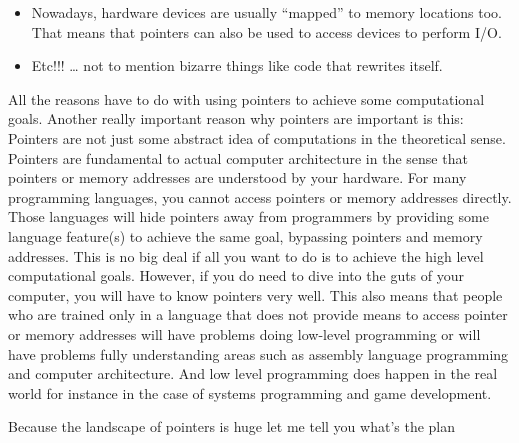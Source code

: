 \documentclass[
]{article}
\begin{document}
\begin{itemize}
\item
  Nowadays, hardware devices are usually ``mapped'' to memory locations
  too. That means that pointers can also be used to access devices to
  perform I/O.
\item
  Etc!!! \ldots{} not to mention bizarre things like code that rewrites
  itself.
\end{itemize}

All the reasons have to do with using pointers to achieve some
computational goals. Another really important reason why pointers are
important is this: Pointers are not just some abstract idea of
computations in the theoretical sense. Pointers are fundamental to
actual computer architecture in the sense that pointers or memory
addresses are understood by your hardware. For many programming
languages, you cannot access pointers or memory addresses directly.
Those languages will hide pointers away from programmers by providing
some language feature(s) to achieve the same goal, bypassing pointers
and memory addresses. This is no big deal if all you want to do is to
achieve the high level computational goals. However, if you do need to
dive into the guts of your computer, you will have to know pointers very
well. This also means that people who are trained only in a language
that does not provide means to access pointer or memory addresses will
have problems doing low-level programming or will have problems fully
understanding areas such as assembly language programming and computer
architecture. And low level programming does happen in the real world
for instance in the case of systems programming and game development.

Because the landscape of pointers is huge let me tell you what's the
plan
\end{document}
